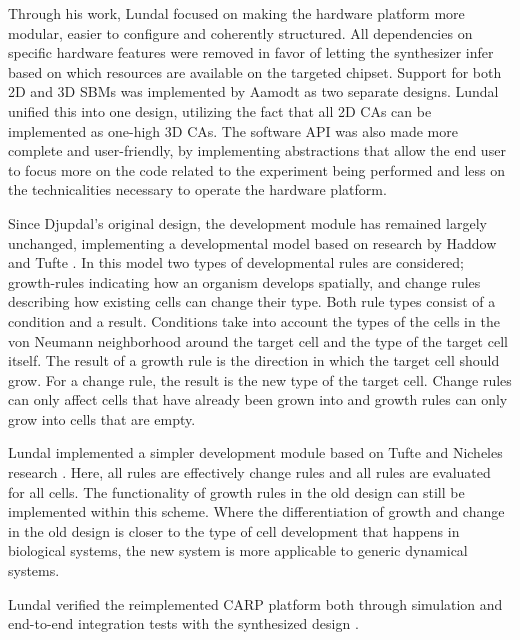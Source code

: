 Through his work, Lundal focused on making the hardware platform more modular,
easier to configure and coherently structured. All dependencies on specific
hardware features were removed in favor of letting the synthesizer infer based
on which resources are available on the targeted chipset. Support for both 2D
and 3D SBMs was implemented by Aamodt as two separate designs. Lundal unified
this into one design, utilizing the fact that all 2D CAs can be implemented as
one-high 3D CAs. The software API was also made more complete and user-friendly,
by implementing abstractions that allow the end user to focus more on the code
related to the experiment being performed and less on the technicalities
necessary to operate the hardware platform.

Since Djupdal's original design, the development module has remained largely
unchanged, implementing a developmental model based on research by Haddow and
Tufte \cite{Tufte2005a}. In this model two types of developmental rules are
considered; growth-rules indicating how an organism develops spatially, and
change rules describing how existing cells can change their type. Both rule
types consist of a condition and a result. Conditions take into account the
types of the cells in the von Neumann neighborhood around the target cell and
the type of the target cell itself. The result of a growth rule is the direction
in which the target cell should grow. For a change rule, the result is the new
type of the target cell. Change rules can only affect cells that have already
been grown into and growth rules can only grow into cells that are empty.

Lundal implemented a simpler development module based on Tufte and Nicheles
research \cite{Nichele2013}. Here, all rules are effectively change rules and all
rules are evaluated for all cells. The functionality of growth rules in the old
design can still be implemented within this scheme. Where the differentiation of
growth and change in the old design is closer to the type of cell development
that happens in biological systems, the new system is more applicable to generic
dynamical systems.

Lundal verified the reimplemented CARP platform both through simulation and
end-to-end integration tests with the synthesized design . 

\cleardoublepage

